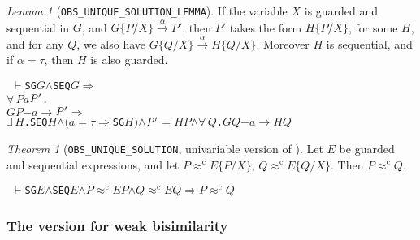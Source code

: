 \documentclass[GCNS]{yincog}
\renewcommand{\HOLConst}[1]{\texttt{#1}}
\renewcommand{\HOLBoundVar}[1]{\ensuremath{\mathit{#1}}}
\renewcommand{\HOLFreeVar}[1]{\ensuremath{\mathit{#1}}}
\renewcommand{\HOLSymConst}[1]{#1}
\renewcommand{\HOLTokenConj}{\ensuremath{\wedge}}
\renewcommand{\HOLTokenExists}{\ensuremath{\exists \,}}
\renewcommand{\HOLTokenForall}{\ensuremath{\forall \,}}
\renewcommand{\HOLTokenTurnstile}{\ensuremath{\:\:\vdash}}
\theoremstyle{remark}
\theoremstyle{theorem}
\newtheorem{lemma}[definition]{Lemma}
\newtheorem{theorem}[definition]{Theorem}
\theoremstyle{remark}
\newcommand{\HOLTokenObsCongr}{$\approx^{\mathrm{c}}\!$}
\newcommand{\HOLTokenTransBegin}{$-$}
\newcommand{\HOLTokenTransEnd}{$\rightarrow$\xspace}
\renewcommand{\HOLTokenImp}{\ensuremath{\Longrightarrow}}
\newcommand{\univariate}{univariable\xspace}
\newcommand{\rapprox}{\mathrel{\approx^{\mathrm{c}}}}
\begin{document}
\begin{lemma}[\texttt{OBS\_UNIQUE\_SOLUTION\_LEMMA}]
If the variable $X$ is guarded and sequential in $G$, and
$G\{P/X\}\overset{\alpha}{\rightarrow} P'$, then $P'$ takes the form
$H\{P/X\}$, for some $H$, and for any $Q$, we also have
$G\{Q/X\}\overset{\alpha}{\rightarrow} H\{Q/X\}$. Moreover $H$ is sequential,
and if $\alpha = \tau $, then $H$ is also guarded.
%
\begin{alltt}
\HOLTokenTurnstile{} \HOLConst{SG} \HOLFreeVar{G} \HOLSymConst{\HOLTokenConj{}} \HOLConst{SEQ} \HOLFreeVar{G} \HOLSymConst{\HOLTokenImp{}}
   \HOLSymConst{\HOLTokenForall{}}\HOLBoundVar{P} \HOLBoundVar{a} \ensuremath{\HOLBoundVar{P}\sp{\prime}}.
       \HOLFreeVar{G} \HOLBoundVar{P} \HOLTokenTransBegin\HOLBoundVar{a}\HOLTokenTransEnd \ensuremath{\HOLBoundVar{P}\sp{\prime}} \HOLSymConst{\HOLTokenImp{}}
       \HOLSymConst{\HOLTokenExists{}}\HOLBoundVar{H}. \HOLConst{SEQ} \HOLBoundVar{H} \HOLSymConst{\HOLTokenConj{}} \ensuremath{(}\HOLBoundVar{a} \HOLSymConst{\ensuremath{=}} \HOLSymConst{\ensuremath{\tau}} \HOLSymConst{\HOLTokenImp{}} \HOLConst{SG} \HOLBoundVar{H}\ensuremath{)} \HOLSymConst{\HOLTokenConj{}} \ensuremath{\HOLBoundVar{P}\sp{\prime}} \HOLSymConst{\ensuremath{=}} \HOLBoundVar{H} \HOLBoundVar{P} \HOLSymConst{\HOLTokenConj{}} \HOLSymConst{\HOLTokenForall{}}\HOLBoundVar{Q}. \HOLFreeVar{G} \HOLBoundVar{Q} \HOLTokenTransBegin\HOLBoundVar{a}\HOLTokenTransEnd \HOLBoundVar{H} \HOLBoundVar{Q}
\end{alltt}
%
\end{lemma}

\begin{theorem}[\texttt{OBS\_UNIQUE\_SOLUTION}, \univariate version of
]
 \label{thm:Mil89s3f}
Let $E$ be guarded and sequential expressions, and let
$P \rapprox E\{P/X\}$, $Q \rapprox E\{Q/X\}$. Then $P \rapprox Q$.
%
\begin{alltt}
\HOLTokenTurnstile{} \HOLConst{SG} \HOLFreeVar{E} \HOLSymConst{\HOLTokenConj{}} \HOLConst{SEQ} \HOLFreeVar{E} \HOLSymConst{\HOLTokenConj{}} \HOLFreeVar{P} \HOLSymConst{\HOLTokenObsCongr} \HOLFreeVar{E} \HOLFreeVar{P} \HOLSymConst{\HOLTokenConj{}} \HOLFreeVar{Q} \HOLSymConst{\HOLTokenObsCongr} \HOLFreeVar{E} \HOLFreeVar{Q} \HOLSymConst{\HOLTokenImp{}} \HOLFreeVar{P} \HOLSymConst{\HOLTokenObsCongr} \HOLFreeVar{Q}
\end{alltt}
%
\end{theorem}

\subsubsection{The version for weak bisimilarity}
 \label{sec4.10.3}
\end{document}

